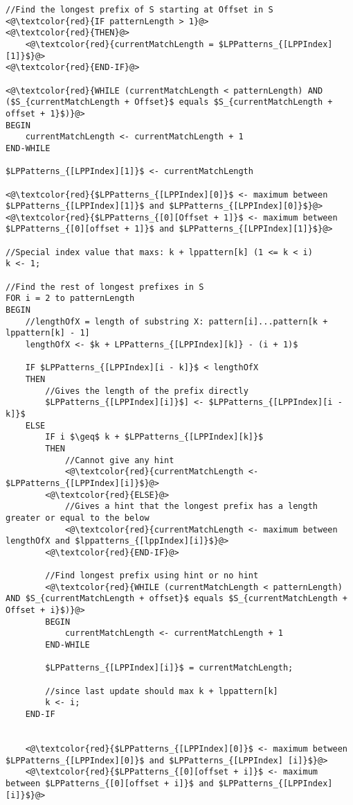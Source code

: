 \documentclass[12pt]{article}
\begin{document}
\begin{flushleft}
\begin{lstlisting}
//Find the longest prefix of S starting at Offset in S
<@\textcolor{red}{IF patternLength > 1}@> 
<@\textcolor{red}{THEN}@>
	<@\textcolor{red}{currentMatchLength = $LPPatterns_{[LPPIndex][1]}$}@>
<@\textcolor{red}{END-IF}@>

<@\textcolor{red}{WHILE (currentMatchLength < patternLength) AND ($S_{currentMatchLength + Offset}$ equals $S_{currentMatchLength + offset + 1}$)}@>
BEGIN
	currentMatchLength <- currentMatchLength + 1
END-WHILE

$LPPatterns_{[LPPIndex][1]}$ <- currentMatchLength

<@\textcolor{red}{$LPPatterns_{[LPPIndex][0]}$ <- maximum between $LPPatterns_{[LPPIndex][1]}$ and $LPPatterns_{[LPPIndex][0]}$}@>
<@\textcolor{red}{$LPPatterns_{[0][Offset + 1]}$ <- maximum between $LPPatterns_{[0][offset + 1]}$ and $LPPatterns_{[LPPIndex][1]}$}@>

//Special index value that maxs: k + lppattern[k] (1 <= k < i)
k <- 1;

//Find the rest of longest prefixes in S
FOR i = 2 to patternLength
BEGIN
	//lengthOfX = length of substring X: pattern[i]...pattern[k + lppattern[k] - 1]
	lengthOfX <- $k + LPPatterns_{[LPPIndex][k]} - (i + 1)$
	
	IF $LPPatterns_{[LPPIndex][i - k]}$ < lengthOfX
	THEN
		//Gives the length of the prefix directly
		$LPPatterns_{[LPPIndex][i]}$] <- $LPPatterns_{[LPPIndex][i - k]}$
	ELSE	
		IF i $\geq$ k + $LPPatterns_{[LPPIndex][k]}$
		THEN
			//Cannot give any hint
			<@\textcolor{red}{currentMatchLength <- $LPPatterns_{[LPPIndex][i]}$}@>
		<@\textcolor{red}{ELSE}@>
			//Gives a hint that the longest prefix has a length greater or equal to the below
			<@\textcolor{red}{currentMatchLength <- maximum between lengthOfX and $lppatterns_{[lppIndex][i]}$}@>
		<@\textcolor{red}{END-IF}@>
		
		//Find longest prefix using hint or no hint
		<@\textcolor{red}{WHILE (currentMatchLength < patternLength) AND $S_{currentMatchLength + offset}$ equals $S_{currentMatchLength + Offset + i}$)}@>
		BEGIN
			currentMatchLength <- currentMatchLength + 1
		END-WHILE
		
		$LPPatterns_{[LPPIndex][i]}$ = currentMatchLength;
		
		//since last update should max k + lppattern[k]
		k <- i;
	END-IF
	

	<@\textcolor{red}{$LPPatterns_{[LPPIndex][0]}$ <- maximum between $LPPatterns_{[LPPIndex][0]}$ and $LPPatterns_{[LPPIndex] [i]}$}@>
	<@\textcolor{red}{$LPPatterns_{[0][offset + i]}$ <- maximum between $LPPatterns_{[0][offset + i]}$ and $LPPatterns_{[LPPIndex] [i]}$}@>
	

\end{lstlisting}
\end{flushleft}
\end{document}
